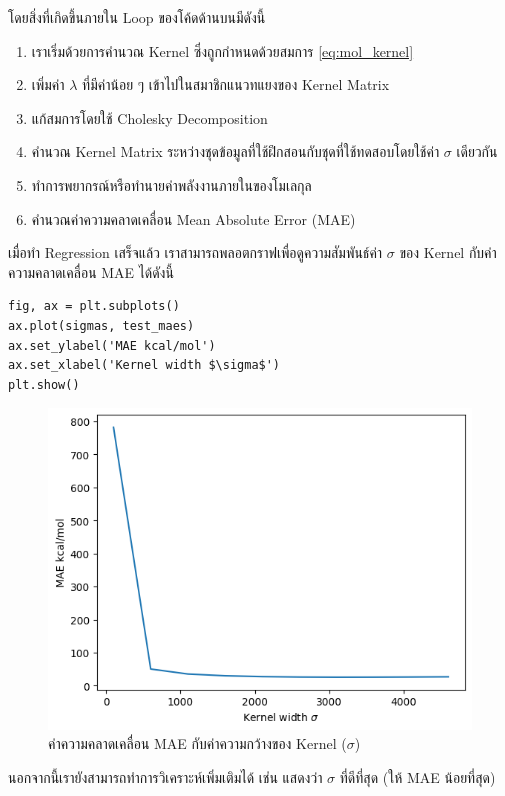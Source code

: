 โดยสิ่งที่เกิดขึ้นภายใน Loop ของโค้ดด้านบนมีดังนี้

\begin{enumerate}[noitemsep]
    \item เราเริ่มด้วยการคำนวณ Kernel ซึ่งถูกกำหนดด้วยสมการ \ref{eq:mol_kernel}
    \item เพิ่มค่า $\lambda$ ที่มีค่าน้อย ๆ เข้าไปในสมาชิกแนวทแยงของ Kernel Matrix
    \item แก้สมการโดยใช้ Cholesky Decomposition
    \item คำนวณ Kernel Matrix ระหว่างชุดข้อมูลที่ใช้ฝึกสอนกับชุดที่ใช้ทดสอบโดยใช้ค่า $\sigma$ เดียวกัน
    \item ทำการพยากรณ์หรือทำนายค่าพลังงานภายในของโมเลกุล
    \item คำนวณค่าความคลาดเคลื่อน Mean Absolute Error (MAE)
\end{enumerate}

เมื่อทำ Regression เสร็จแล้ว เราสามารถพลอตกราฟเพื่อดูความสัมพันธ์ค่า $\sigma$ ของ Kernel กับค่าความคลาดเคลื่อน MAE ได้ดังนี้

\begin{lstlisting}[style=MyPython]
fig, ax = plt.subplots()
ax.plot(sigmas, test_maes)
ax.set_ylabel('MAE kcal/mol')
ax.set_xlabel('Kernel width $\sigma$')
plt.show()
\end{lstlisting}

\begin{figure}[H]
    \centering
    \includegraphics[width=0.9\linewidth]{fig/qm9_cm_mae_sigma.png}
    \caption{ค่าความคลาดเคลื่อน MAE กับค่าความกว้างของ Kernel ($\sigma$)}
    \label{fig:qm9_cm_kernel_mae}
\end{figure}

นอกจากนี้เรายังสามารถทำการวิเคราะห์เพิ่มเติมได้ เช่น แสดงว่า $\sigma$ ที่ดีที่สุด (ให้ MAE น้อยที่สุด)


